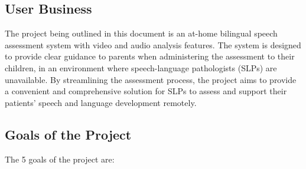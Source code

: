 \documentclass[12pt]{article}
\begin{document}
\subsection{User Business}
\hspace{2em}The project being outlined in this document is an at-home bilingual speech 
assessment system with video and audio analysis features. The system is designed 
to provide clear guidance to parents when administering the assessment to their 
children, in an environment where speech-language pathologists (SLPs) are 
unavailable. By streamlining the assessment process, the project aims to provide a 
convenient and comprehensive solution for SLPs to assess and support their patients'
speech and language development remotely. 

\subsection{Goals of the Project}
\hspace{2em}The 5 goals of the project are:
\end{document}
